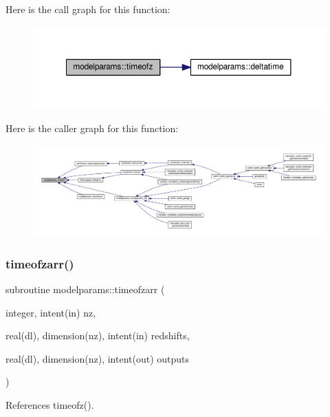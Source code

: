 Here is the call graph for this function\+:
\nopagebreak
\begin{figure}[H]
\begin{center}
\leavevmode
\includegraphics[width=350pt]{namespacemodelparams_ae8f7910867e2ed755e7f4d5eacdeee2d_cgraph}
\end{center}
\end{figure}
Here is the caller graph for this function\+:
\nopagebreak
\begin{figure}[H]
\begin{center}
\leavevmode
\includegraphics[width=350pt]{namespacemodelparams_ae8f7910867e2ed755e7f4d5eacdeee2d_icgraph}
\end{center}
\end{figure}
\mbox{\label{namespacemodelparams_aa9fc9f952c72345785fa69b491e598d5}} 
\subsubsection{\texorpdfstring{timeofzarr()}{timeofzarr()}}
{\footnotesize\ttfamily subroutine modelparams\+::timeofzarr (\begin{DoxyParamCaption}\item[{integer, intent(in)}]{nz,  }\item[{real(dl), dimension(nz), intent(in)}]{redshifts,  }\item[{real(dl), dimension(nz), intent(out)}]{outputs }\end{DoxyParamCaption})}



References timeofz().

